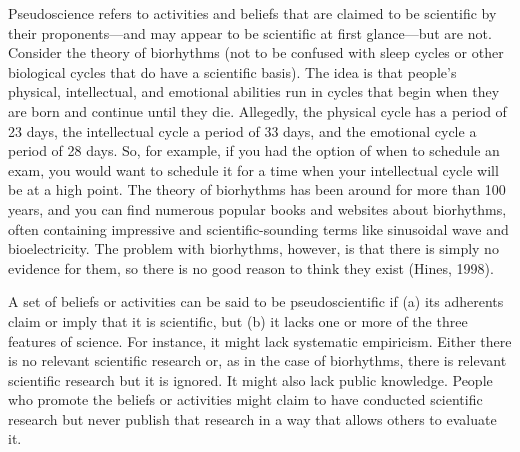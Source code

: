 
Pseudoscience refers to activities and beliefs that are claimed to be scientific by their proponents---and may appear to be scientific at first glance---but are not. Consider the theory of biorhythms (not to be confused with sleep cycles or other biological cycles that do have a scientific basis). The idea is that people's physical, intellectual, and emotional abilities run in cycles that begin when they are born and continue until they die. Allegedly, the physical cycle has a period of 23 days, the intellectual cycle a period of 33 days, and the emotional cycle a period of 28 days. So, for example, if you had the option of when to schedule an exam, you would want to schedule it for a time when your intellectual cycle will be at a high point. The theory of biorhythms has been around for more than 100 years, and you can find numerous popular books and websites about biorhythms, often containing impressive and scientific-sounding terms like sinusoidal wave and bioelectricity. The problem with biorhythms, however, is that there is simply no evidence for them, so there is no good reason to think they exist (Hines, 1998).

A set of beliefs or activities can be said to be pseudoscientific if (a) its adherents claim or imply that it is scientific, but (b) it lacks one or more of the three features of science. For instance, it might lack systematic empiricism. Either there is no relevant scientific research or, as in the case of biorhythms, there is relevant scientific research but it is ignored. It might also lack public knowledge. People who promote the beliefs or activities might claim to have conducted scientific research but never publish that research in a way that allows others to evaluate it.

